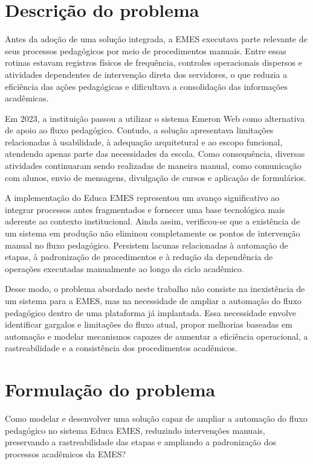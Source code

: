 \section{Descrição do problema}
\label{sec:intro:prob}

Antes da adoção de uma solução integrada, a EMES executava parte relevante de
seus processos pedagógicos por meio de procedimentos manuais. Entre essas
rotinas estavam registros físicos de frequência, controles operacionais
dispersos e atividades dependentes de intervenção direta dos servidores, o que
reduzia a eficiência das ações pedagógicas e dificultava a consolidação das
informações acadêmicas.

Em 2023, a instituição passou a utilizar o sistema Emeron Web como alternativa
de apoio ao fluxo pedagógico. Contudo, a solução apresentava limitações
relacionadas à usabilidade, à adequação arquitetural e ao escopo funcional,
atendendo apenas parte das necessidades da escola. Como consequência, diversas
atividades continuaram sendo realizadas de maneira manual, como comunicação com
alunos, envio de mensagens, divulgação de cursos e aplicação de formulários.

A implementação do Educa EMES representou um avanço significativo ao integrar
processos antes fragmentados e fornecer uma base tecnológica mais aderente ao
contexto institucional. Ainda assim, verificou-se que a existência de um sistema
em produção não eliminou completamente os pontos de intervenção manual no fluxo
pedagógico. Persistem lacunas relacionadas à automação de etapas, à
padronização de procedimentos e à redução da dependência de operações
executadas manualmente ao longo do ciclo acadêmico.

Desse modo, o problema abordado neste trabalho não consiste na inexistência de
um sistema para a EMES, mas na necessidade de ampliar a automação do fluxo
pedagógico dentro de uma plataforma já implantada. Essa necessidade envolve
identificar gargalos e limitações do fluxo atual, propor melhorias baseadas em
automação e modelar mecanismos capazes de aumentar a eficiência operacional, a
rastreabilidade e a consistência dos procedimentos acadêmicos.

\section{Formulação do problema}
\label{sec:intro:form_prob}

Como modelar e desenvolver uma solução capaz de ampliar a automação do fluxo
pedagógico no sistema Educa EMES, reduzindo intervenções manuais, preservando a
rastreabilidade das etapas e ampliando a padronização dos processos acadêmicos
da EMES?

